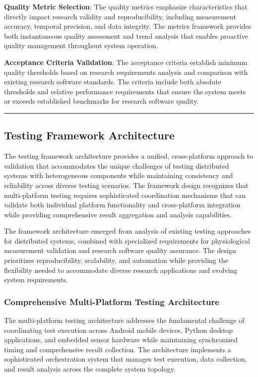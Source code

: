 \documentclass[12pt,a4paper]{article}
\begin{document}
\textbf{Quality Metric Selection}: The quality metrics emphasize characteristics that directly impact research validity and
reproducibility, including measurement accuracy, temporal precision, and data integrity. The metrics framework provides
both instantaneous quality assessment and trend analysis that enables proactive quality management throughout system
operation.

\textbf{Acceptance Criteria Validation}: The acceptance criteria establish minimum quality thresholds based on research
requirements analysis and comparison with existing research software standards. The criteria include both absolute
thresholds and relative performance requirements that ensure the system meets or exceeds established benchmarks for
research software quality.

\hrule

\subsection{Testing Framework Architecture}

The testing framework architecture provides a unified, cross-platform approach to validation that accommodates the
unique challenges of testing distributed systems with heterogeneous components while maintaining consistency and
reliability across diverse testing scenarios. The framework design recognizes that multi-platform testing requires
sophisticated coordination mechanisms that can validate both individual platform functionality and cross-platform
integration while providing comprehensive result aggregation and analysis capabilities.

The framework architecture emerged from analysis of existing testing approaches for distributed systems, combined with
specialized requirements for physiological measurement validation and research software quality assurance. The design
prioritizes reproducibility, scalability, and automation while providing the flexibility needed to accommodate diverse
research applications and evolving system requirements.

\subsubsection{Comprehensive Multi-Platform Testing Architecture}

The multi-platform testing architecture addresses the fundamental challenge of coordinating test execution across
Android mobile devices, Python desktop applications, and embedded sensor hardware while maintaining synchronized timing
and comprehensive result collection. The architecture implements a sophisticated orchestration system that manages test
execution, data collection, and result analysis across the complete system topology.
\end{document}
